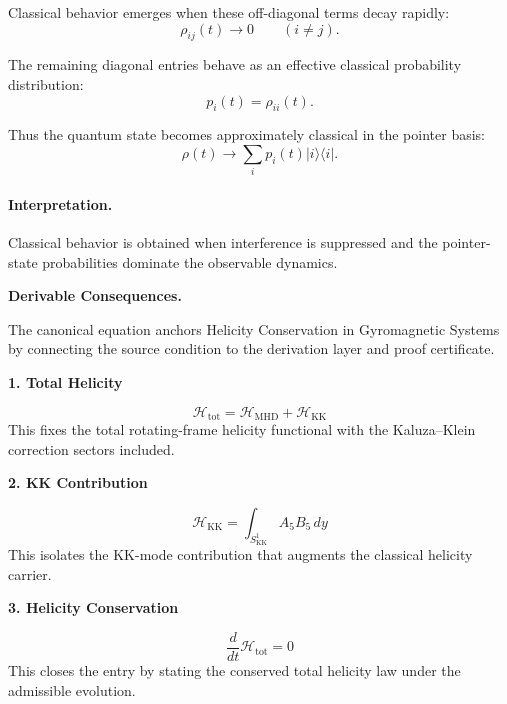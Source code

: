 Classical behavior emerges when these off-diagonal terms decay rapidly:
\begin{equation}
\rho_{ij}(t)\rightarrow 0
\qquad
(i\neq j).
\end{equation}

The remaining diagonal entries behave as an effective classical probability distribution:
\begin{equation}
p_i(t)=\rho_{ii}(t).
\end{equation}

Thus the quantum state becomes approximately classical in the pointer basis:
\begin{equation}
\boxed{
\rho(t)
\longrightarrow
\sum_i p_i(t)|i\rangle\langle i|.
}
\end{equation}

\paragraph{Interpretation.}
Classical behavior is obtained when interference is suppressed and the pointer-state probabilities dominate the observable dynamics.

\par\vspace{0.35em}
\noindent\textbf{Derivable Consequences.}\quad
\begingroup
\footnotesize
\raggedright
The canonical equation anchors Helicity Conservation in Gyromagnetic Systems by connecting the source condition to the derivation layer and proof certificate.
\par\endgroup

\noindent\textbf{1. Total Helicity}\par
\[
\mathcal{H}_{\mathrm{tot}}=\mathcal{H}_{\mathrm{MHD}}+\mathcal{H}_{\mathrm{KK}}
\]
\noindent This fixes the total rotating-frame helicity functional with the Kaluza--Klein correction sectors included.\par
\noindent\textbf{2. KK Contribution}\par
\[
\mathcal{H}_{\mathrm{KK}}=\int_{S^{1}_{\mathrm{KK}}}A_{5}B_{5}\,dy
\]
\noindent This isolates the KK-mode contribution that augments the classical helicity carrier.\par
\noindent\textbf{3. Helicity Conservation}\par
\[
\frac{d}{dt}\mathcal{H}_{\mathrm{tot}}=0
\]
\noindent This closes the entry by stating the conserved total helicity law under the admissible evolution.\par

